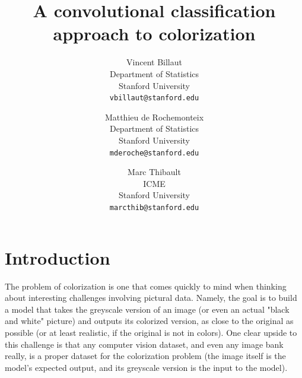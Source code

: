 \documentclass[10pt,twocolumn,letterpaper]{article}
\begin{document}
\title{A convolutional classification approach to colorization}

\author{Vincent Billaut\\
Department of Statistics\\
Stanford University\\
{\tt\small vbillaut@stanford.edu}
\and
Matthieu de Rochemonteix\\
Department of Statistics\\
Stanford University\\
{\tt\small mderoche@stanford.edu}
\and
Marc Thibault\\
ICME\\
Stanford University\\
{\tt\small marcthib@stanford.edu}
}

\maketitle



%

\section{Introduction}

The problem of colorization is one that comes quickly to mind when thinking about interesting challenges involving pictural data. Namely, the goal is to build a model that takes the greyscale version of an image (or even an actual "black and white" picture) and outputs its colorized version, as close to the original as possible (or at least realistic, if the original is not in colors).
One clear upside to this challenge is that any computer vision dataset, and even any image bank really, is a proper dataset for the colorization problem (the image itself is the model's expected output, and its greyscale version is the input to the model).
\end{document}
